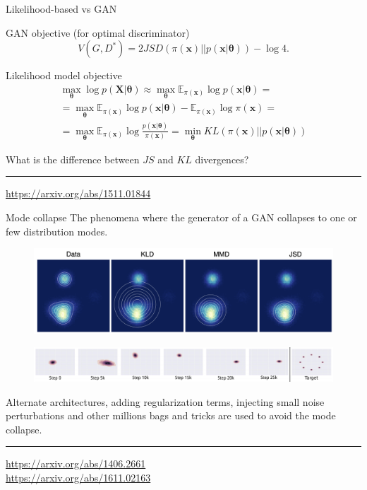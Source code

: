 \documentclass{beamer}
\newcommand{\bx}{\mathbf{x}}
\newcommand{\bX}{\mathbf{X}}
\newcommand{\bbE}{\mathbb{E}}
\newcommand{\btheta}{\boldsymbol{\theta}}
\begin{document}
\begin{frame}{Likelihood-based vs GAN}
	\begin{block}{GAN objective (for optimal discriminator)}
		\vspace{-0.2cm}
		\[
			V(G, D^*)  = 2JSD(\pi(\bx) || p(\bx | \btheta)) - \log 4.
		\]
	\end{block}
	\begin{block}{Likelihood model objective}
		\vspace{-0.6cm}
		\begin{multline*}
			\max_{\btheta} \log p(\bX | \btheta) \approx \max_{\btheta}\bbE_{\pi(\bx)} \log p(\bx | \btheta) = \\ = \max_{\btheta}\bbE_{\pi(\bx)} \log p(\bx | \btheta) - \bbE_{\pi(\bx)} \log \pi(\bx) = \\ = \max_{\btheta}\bbE_{\pi(\bx)}  \log \frac{p(\bx | \btheta)}{\pi(\bx)}= \min_{\btheta} KL(\pi(\bx) || p(\bx | \btheta))
		\end{multline*}
	\vspace{-0.6cm}
	\end{block}

	What is the difference between $JS$ and $KL$ divergences?
\vfill
\hrule\medskip
{\scriptsize \href{https://arxiv.org/abs/1511.01844}{https://arxiv.org/abs/1511.01844}}
\end{frame}
\begin{frame}{Mode collapse}
The phenomena where the generator of a GAN collapses to one or few distribution modes.
\begin{figure}
	\centering
	\includegraphics[width=0.9\linewidth]{figs/mode_collapse_1}
\end{figure}
\begin{figure}
	\centering
	\includegraphics[width=1.0\linewidth]{figs/mode_collapse_3}
\end{figure}
Alternate architectures, adding regularization terms, injecting small noise
perturbations and other millions bags and tricks are used to avoid the mode collapse.
\vfill
\hrule\medskip
{\scriptsize \href{https://arxiv.org/abs/1406.2661}{https://arxiv.org/abs/1406.2661} \\ \href{https://arxiv.org/abs/1611.02163}{https://arxiv.org/abs/1611.02163}}
\end{frame}
\end{document}
